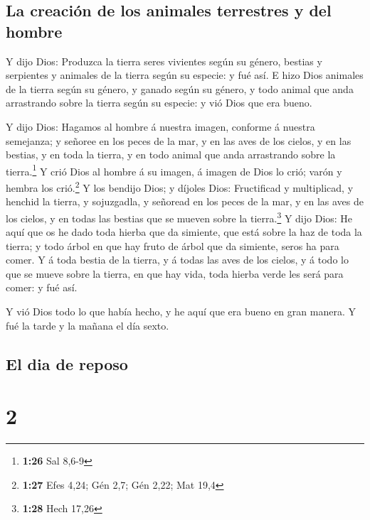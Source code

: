 \hypertarget{la-creaciuxf3n-de-los-animales-terrestres-y-del-hombre}{%
\subsection{La creación de los animales terrestres y del
hombre}\label{la-creaciuxf3n-de-los-animales-terrestres-y-del-hombre}}

 Y dijo Dios: Produzca la tierra seres vivientes según su
género, bestias y serpientes y animales de la tierra según su especie: y
fué así.  E hizo Dios animales de la tierra según su
género, y ganado según su género, y todo animal que anda arrastrando
sobre la tierra según su especie: y vió Dios que era bueno.

 Y dijo Dios: Hagamos al hombre á nuestra imagen, conforme
á nuestra semejanza; y señoree en los peces de la mar, y en las aves de
los cielos, y en las bestias, y en toda la tierra, y en todo animal que
anda arrastrando sobre la tierra.\footnote{\textbf{1:26} Sal 8,6-9}
 Y crió Dios al hombre á su imagen, á imagen de Dios lo
crió; varón y hembra los crió.\footnote{\textbf{1:27} Efes 4,24; Gén
  2,7; Gén 2,22; Mat 19,4}  Y los bendijo Dios; y díjoles
Dios: Fructificad y multiplicad, y henchid la tierra, y sojuzgadla, y
señoread en los peces de la mar, y en las aves de los cielos, y en todas
las bestias que se mueven sobre la tierra.\footnote{\textbf{1:28} Hech
  17,26}  Y dijo Dios: He aquí que os he dado toda hierba
que da simiente, que está sobre la haz de toda la tierra; y todo árbol
en que hay fruto de árbol que da simiente, seros ha para comer.
 Y á toda bestia de la tierra, y á todas las aves de los
cielos, y á todo lo que se mueve sobre la tierra, en que hay vida, toda
hierba verde les será para comer: y fué así.

 Y vió Dios todo lo que había hecho, y he aquí que era
bueno en gran manera. Y fué la tarde y la mañana el día sexto.

\hypertarget{el-dia-de-reposo}{%
\subsection{El dia de reposo}\label{el-dia-de-reposo}}

\hypertarget{section-1}{%
\section{2}\label{section-1}}

